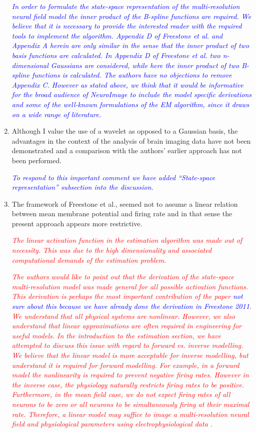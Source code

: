 \documentclass{article}
\newcommand{\dean}[1]{\textcolor{red}{#1}}
\newcommand{\parham}[1]{\textcolor{blue}{#1}}
\begin{document}
\begin{enumerate}
\emph{\parham{In order to formulate the state-space representation of the multi-resolution neural field model the inner product of the B-spline functions are required. We believe that it is necessary to provide the interested reader with the required tools to implement the algorithm. Appendix D of Freestone et al. and Appendix A herein are only similar in the sense that the inner product of two basis functions are calculated. In Appendix D of Freestone et al. two  n-dimensional Gaussians are considered, while here the inner product of two B-spline functions is calculated. The authors have no objections to remove Appendix C. However as stated above, we think that it would be informative for the broad audience of NeuroImage to include the model specific derivations and some of the well-known formulations of the EM algorithm, since it draws on a wide range of literature.} }

        \item Although I value the use of a wavelet as opposed to a Gaussian basis, the advantages in the context of the analysis of brain imaging data have not been demonstrated and a comparison with the authors' earlier approach has not been performed.  

\emph{\parham{To respond to this important comment we have added ``State-space representation'' subsection into the discussion.}}

				\item{The framework of Freestone et al., seemed not to assume a linear relation between mean membrane potential and firing rate and in that sense the present approach appears more restrictive. }

\emph{\dean{The linear activation function in the estimation algorithm was made out of necessity. This was due to the high dimensionality and associated computational demands of the estimation problem.}}

\emph{\dean{The authors would like to point out that the derivation of the state-space multi-resolution model was made general for all possible activation functions. This derivation is perhaps the most important contribution of the paper \parham{not sure about this because we have already done the derivation in Freestone 2011}. We understand that all physical systems are nonlinear. However, we also understand that linear approximations are often required in engineering for useful models. In the introduction to the estimation section, we have attempted to discuss this issue with regard to forward vs. inverse modelling. We believe that the linear model is more acceptable for inverse modelling, but understand it is required for forward modelling. For example, in a forward model the nonlinearity is required to prevent negative firing rates. However in the inverse case, the physiology naturally restricts firing rates to be positive. Furthermore, in the mean field case, we do not expect firing rates of all neurons to be zero or all neurons to be simultaneously firing at their maximal rate. Therefore, a linear model may suffice to image a multi-resolution neural field and physiological parameters using electrophysiological data .}}
				

\end{enumerate}
\end{document}
